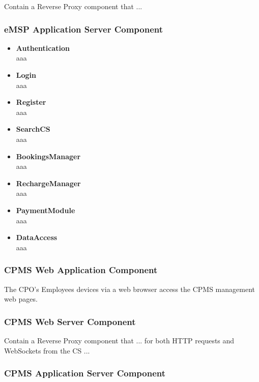 \documentclass[11pt]{article}
\begin{document}
Contain a Reverse Proxy component that ... 

\subsubsection{eMSP Application Server Component}

\begin{itemize}
    \item \textbf{Authentication} \\
        aaa
    \item \textbf{Login} \\
        aaa
    \item \textbf{Register} \\
        aaa
    \item \textbf{SearchCS} \\
        aaa
    \item \textbf{BookingsManager} \\
        aaa
    \item \textbf{RechargeManager} \\
        aaa
    \item \textbf{PaymentModule} \\
        aaa
    \item \textbf{DataAccess} \\
        aaa
\end{itemize}

\subsubsection{CPMS Web Application Component}

The CPO's Employees devices via a web browser access the CPMS management web pages.

\subsubsection{CPMS Web Server Component}

Contain a Reverse Proxy component that ... for both HTTP requests and WebSockets from the CS ...

\subsubsection{CPMS Application Server Component}
\end{document}
